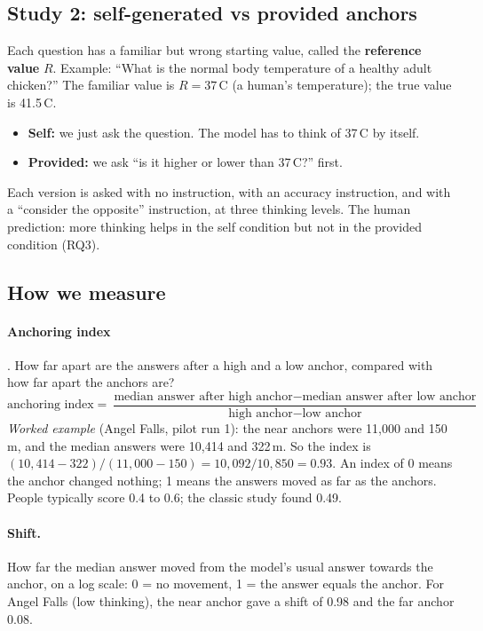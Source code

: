 \documentclass[11pt,a4paper]{article}
\begin{document}
\subsection{Study 2: self-generated vs provided anchors}

Each question has a familiar but wrong starting value, called the \textbf{reference value} $R$. Example: ``What is the normal body temperature of a healthy adult chicken?'' The familiar value is $R=37$\,\textdegree C (a human's temperature); the true value is 41.5\,\textdegree C.
\begin{itemize}
  \item \textbf{Self:} we just ask the question. The model has to think of 37\,\textdegree C by itself.
  \item \textbf{Provided:} we ask ``is it higher or lower than 37\,\textdegree C?'' first.
\end{itemize}
Each version is asked with no instruction, with an accuracy instruction, and with a ``consider the opposite'' instruction, at three thinking levels. The human prediction: more thinking helps in the self condition but not in the provided condition (RQ3).

\subsection{How we measure}
\label{sec:measures}

\paragraph{Anchoring index} \citep{jacowitz1995measures}. How far apart are the answers after a high and a low anchor, compared with how far apart the anchors are?
\[
\text{anchoring index} = \frac{\text{median answer after high anchor} - \text{median answer after low anchor}}{\text{high anchor} - \text{low anchor}}
\]
\emph{Worked example} (Angel Falls, pilot run 1): the near anchors were 11,000 and 150\,m, and the median answers were 10,414 and 322\,m. So the index is $(10{,}414 - 322)/(11{,}000-150) = 10{,}092/10{,}850 = 0.93$. An index of 0 means the anchor changed nothing; 1 means the answers moved as far as the anchors. People typically score 0.4 to 0.6; the classic study found 0.49.

\paragraph{Shift.} How far the median answer moved from the model's usual answer towards the anchor, on a log scale: 0 = no movement, 1 = the answer equals the anchor. For Angel Falls (low thinking), the near anchor gave a shift of 0.98 and the far anchor 0.08.
\end{document}
